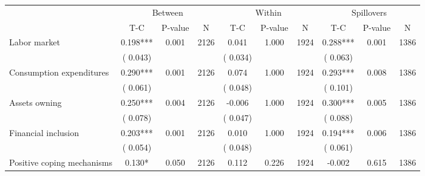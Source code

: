 
\begin{tabular}{l*{9}{c}}\hline&\multicolumn{3}{c}{Between}&\multicolumn{3}{c}{Within}&\multicolumn{3}{c}{Spillovers} \\ \cmidrule(r){2-4}\cmidrule(l){5-7}\cmidrule(l){8-10} & {T-C} & {P-value} & {N} & {T-C} & {P-value} & {N}  & {T-C} & {P-value} & {N}  \\ \midrule
 Labor market                 &              0.198***          &        0.001 & 2126          &              0.041          &        1.000 & 1924          &        0.288*** &        0.001 & 1386                 \\ 
                               &        (       0.043) & &                                                                 &       (       0.034) & &                                                          &       (       0.063)      & &     \\ 
 Consumption expenditures                 &              0.290***          &        0.001 & 2126          &              0.074 &        1.000 & 1924                   &        0.293*** &        0.008 & 1386                 \\ 
                               &        (       0.061) & &                                                                 &       (       0.048) & &                                                          &       (       0.101) & &  \\ 
 Assets owning                 &              0.250***          &        0.004 & 2126          &             -0.006 &        1.000 & 1924                   &        0.300*** &        0.005 & 1386                 \\ 
                               &        (       0.078) & &                                                                 &       (       0.047) & &                                                          & (       0.088)                                    \\ 
 Financial inclusion                 &              0.203***          &        0.001 & 2126          &              0.010 &        1.000 & 1924                   &        0.194*** &        0.006 & 1386                 \\ 
                               &        (       0.054) & &                                                                 &       (       0.048) & &                                                          &       (       0.061) & &   \\ 
 Positive coping mechanisms                 &              0.130*          &        0.050 & 2126          &              0.112 &        0.226 & 1924                   &       -0.002 &        0.615 & 1386                 \\ 

\end{tabular}
